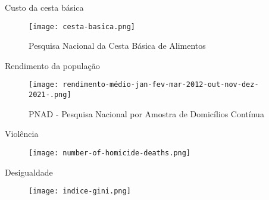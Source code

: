 \begin{frame}[c]{Custo da cesta básica}
	\begin{figure}
		\texttt{[image: cesta-basica.png]}

		\caption{Pesquisa Nacional da Cesta Básica de Alimentos \cite{DIEESECestaBasica}}
	\end{figure}
\end{frame}

\begin{frame}[c]{Rendimento da população}
	\begin{figure}
		\texttt{[image: rendimento-médio-jan-fev-mar-2012-out-nov-dez-2021-.png]}

		\caption{PNAD - Pesquisa Nacional por Amostra de Domicílios Contínua \cite{IBGEpnad}\nocite{DIEESESalario}}
	\end{figure}
\end{frame}

\begin{frame}[c]{Violência}
	\begin{figure}
		\texttt{[image: number-of-homicide-deaths.png]}

		\caption{\cite{OurWorldInData}}
	\end{figure}
\end{frame}

\begin{frame}[c]{Desigualdade}
	\begin{figure}
		\texttt{[image: indice-gini.png]}
		
		\caption{\cite{IndicadoresSociais}}
	\end{figure}
\end{frame}